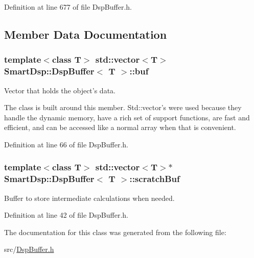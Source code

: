 Definition at line 677 of file Dsp\+Buffer.\+h.



\subsection{Member Data Documentation}
\hypertarget{class_smart_dsp_1_1_dsp_buffer_a7abb8184e08f4c9762f66bc75dcd3a6a}{
\subsubsection[{buf}]{\setlength{\rightskip}{0pt plus 5cm}template$<$class T$>$ std\+::vector$<$T$>$ {\bf Smart\+Dsp\+::\+Dsp\+Buffer}$<$ T $>$\+::buf}}\label{class_smart_dsp_1_1_dsp_buffer_a7abb8184e08f4c9762f66bc75dcd3a6a}


Vector that holds the object's data. 

The class is built around this member. Std\+::vector's were used because they handle the dynamic memory, have a rich set of support functions, are fast and efficient, and can be accessed like a normal array when that is convenient. 

Definition at line 66 of file Dsp\+Buffer.\+h.

\hypertarget{class_smart_dsp_1_1_dsp_buffer_a4e15156afafbd16b0b7606f56f73d14f}{
\subsubsection[{scratch\+Buf}]{\setlength{\rightskip}{0pt plus 5cm}template$<$class T$>$ std\+::vector$<$T$>$$\ast$ {\bf Smart\+Dsp\+::\+Dsp\+Buffer}$<$ T $>$\+::scratch\+Buf\hspace{0.3cm}{\ttfamily [protected]}}}\label{class_smart_dsp_1_1_dsp_buffer_a4e15156afafbd16b0b7606f56f73d14f}


Buffer to store intermediate calculations when needed. 



Definition at line 42 of file Dsp\+Buffer.\+h.



The documentation for this class was generated from the following file\+:\begin{DoxyCompactItemize}
\item 
src/\hyperlink{_dsp_buffer_8h}{Dsp\+Buffer.\+h}\end{DoxyCompactItemize}
